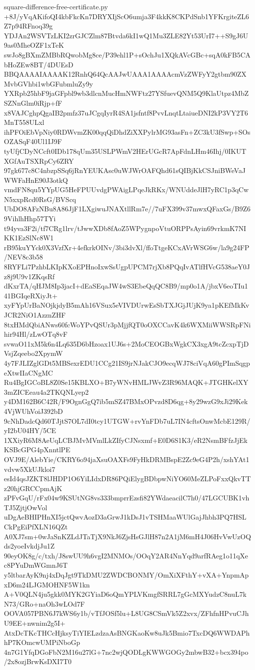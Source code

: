 \documentclass[11pt]{article}
\theoremstyle{definition}
\theoremstyle{remark}
\begin{document}
\begin{filecontents*}[overwrite]{square-difference-free-certificate.py}
+8J/yVqAKifoQI4kbFkcKn7DRYXIjScO6umja3F4kkK8CKPdSnb1YFKrgiteZL6Z7p94RFnoq39g
YDJAn2WSVTzLKI2zrGJCZlm87Btvda6kI1wQ1Mu3ZLE82Yt53UrI7++S9gJ6U9as0MheOZF1xTeK
swJo8gBXmZMBbRQwobMg8ce/P39ehl1P+sOchJu1XQkAVcGBc+sqA0kFB5CAbHoZEw8BT/4DUEsD
BBQAAAAIAAAAK12RnhQ64QcAAJwUAAA1AAAAcmVzZWFyY2gtbm90ZXMvbGVhbi1wbGFubmluZy9y
YXRpb25hbF9jaGFpbl9wb3dlcnMucHmNWFtz27YSfuevQNM5Q9KlaUtpz4MbZSZNnGlm0iRjp+fF
x8VAJCghpQgaIB2pmfz37uJCgqIyrR4SA1jsfntf8PvvLnqtLtaiueDNI2kP3VY2T6MnT558ULxl
ihPFOiEbVpNiy0RDWvmZK00qqQiDhdZiXXPylrMG93asFn+ZC3kU3fSwp+SOsOZASqF40Ul1IJ9F
tyUfjCDyNCcft0IDb178qUm35USLPWmV2HErUGcR7ApFdnLHm46Ihj/0IKUTXGfAuTSXRpCy6ZRY
97gk677c8C4nbzpSSq6jRnYEUKAsc0uWJWrOAFQhd61sQIBjKkCSJniBWeVaJWWFaHnE90J3otkQ
vmdFN8qu5YYpUG5HeFPUUvdgPWAigLPqeJkRKx/WNUddeJlH7yRC1p3qCwN5xxpRcd0RsG/BVScq
UbDO8AFzNBu8A86JjF1LXgiwuJNAXtllRm7e//7uFX399v37mwxQFaxGs/B9Z69VihlhHhp57TYi
t94yva3F2i/tf7CRg1lrv/tJwwXDb8fAoZ5WPygnpoVtuORPPsAyin69vrkmK7NIKK1EzSlNc8W1
rB95kuYYck0X3VzfXr+4efkrkOINv/3bi3dvXl/ffoTtgeKCxAVrWSG6w/la9g24FP/NEV8c3b58
8RYFLi7PzhbLKIpKXoEPHnoIxwSsUgpUPCM7rjXb8PQqIvATlfHVcG538aeY0Jz8j9U9v1ZKqsRf
dKxrTA/qHJM8Ip3jacI+dEaSEqaJW4wS3EbeQqQC8B9/mp0o1A/jbxV6eoTIu141BGIqeRXiyJt+
xyFYpUrBaNOjkjdyB5mAh16VSux5eVIVDUrwEsSbTXJGjJUjK9ya1pKEfMkKvJCR2NiO1AzznZHF
8txHMdQbiANws60fcWoYPvQSUr3pMjjfQT0oOXCCavK4k6WXMiiWWSRpFNihir94Hl/zLwOTq8vF
svwaO11xM5k6n4Lq635D6bHzoax1UJ6s+2MoCEOGBxWgkCX3xgA9tcZcxpTjDVsjZqeebo2XpymW
4y7FJLIZglGDt5MBSexrEDU1CCg21IS9jrNJakCJO9ecqWJ78ciVqA60gPImSqgpeXtwIIaCNgMC
Ru4BgIGCoBL8Z0Se15KBLXO+B7yWNvHMLJWvZ3R96MAQK+JTGHKelXY3mZICEeau4a2TKQNLyep2
y4DM162B6C42R/F9OgnGgQ7ib5mSZ47BMxOPvzd8D6qg+8y29wzG9xJi29Kek4VjWUhVoiJ392bD
9cNhDadcQd60TJjtS7OL7dI0tcy1UTGW+rvYnFDb7uL7IN4cftsOnwMcbE129R/yI2bU04HY/5CE
1XXiyR6M8AeUqLCBJMvMVmlLkZIfyCJNsxmf+E0D6S1K3/eR2NsmBFfzJjEkKSBcGPG4pXnntlPE
OVJ9E/AlebYie/CKRY6o94jaXsuOAXFs9FyHkDRMBspE2Zc9eG4P2h/xshYAt1vdvw5XkUJkloi7
esId4qsJZKT8lJHDP1O6YiLIdxDR86PQiElygBDbpwNiYO60MeZLPoFxxQkvTTz20hjGRCCpmAjK
zPFvGqU/rFx04w9KSUtNG8vs333bmprrEzsfi82YWdaeacilC7h0/47LGCUBK1vhTJ5ZjtjOwVol
uDgAeBHIPHnXI5jctQwvAozD3aGrwJ1kDsJ1vTSHMaaWUlGajJhbh3PQ7HSLCkPgEiPfXLN16QZt
A0XJ7sm+0wJaSnKZLdJTaTjX9NkJ6ZjsHsGJlH87n2A1jM6mH4J06HvVwUzOQds2yoeIvkdjJu1Z
90eyOK8g/c/txh/J8swUU9h6vgI2MNMOs/OOqY2AR4NnYqd9arfRAeg1o11qXec8PYuDmWGmnJ6T
y5ltbarAyK9nj4xDqJgt9TkDMU2ZWDCBONMY/OmXiXFthY+vXA+YnpmApxD6m24LJGMOHNF5W1kn
A+V0QLN4ju5gkk0MYK2GYiaD6oQmYPLVKmgfSRRL7gGcMXYudzC8nuL7kN73/GRo+naOh3wLOd7F
OOVA057PBN6J7kWS6y1b/vTfJOSf5lu+L8UG8CSmVk5Z2xvx/ZFhfnHPvuCJhU9EE+nwnim2g5I+
AtxDcTKcTHCcHjksyTiYIELzdzaAsBNGKaoKw8uJk5Bmio7TxcDQ6WWDAPhhP7KOmcwUMPiNboGp
4n7G1YfqDGoFbN2M16u27lG+7nc2wjQODLgKWWGOGy2mbwB32+bcx394po/2x8ozjBrwKsDXI7T0

\end{filecontents*}
\end{document}
